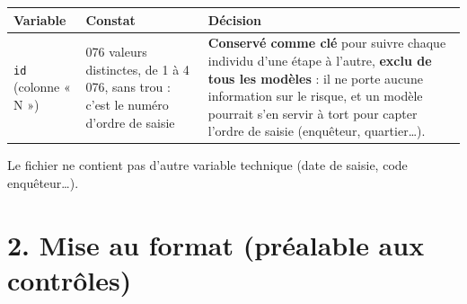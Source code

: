 \documentclass[

  french,

  10pt,

  a4paper,

]{article}
\newcounter{none} %
\begin{document}
{\def\LTcaptype{none} %

\begin{longtable}[]{@{}

  >{\raggedright\arraybackslash}p{}

  >{\raggedright\arraybackslash}p{}

  >{\raggedright\arraybackslash}p{}@{}}

\toprule\noalign{}

\begin{minipage}[b]{\linewidth}\raggedright

Variable

\end{minipage} & \begin{minipage}[b]{\linewidth}\raggedright

Constat

\end{minipage} & \begin{minipage}[b]{\linewidth}\raggedright

Décision

\end{minipage} \\

\midrule\noalign{}

\endhead

\bottomrule\noalign{}

\endlastfoot

\texttt{id} (colonne « N ») & 4 076 valeurs distinctes, de 1 à 4 076, sans trou : c'est le numéro d'ordre de saisie & \textbf{Conservé comme clé} pour suivre chaque individu d'une étape à l'autre, \textbf{exclu de tous les modèles} : il ne porte aucune information sur le risque, et un modèle pourrait s'en servir à tort pour capter l'ordre de saisie (enquêteur, quartier\ldots). \\

\end{longtable}

}



Le fichier ne contient pas d'autre variable technique (date de saisie, code enquêteur\ldots).



\section{2. Mise au format (préalable aux contrôles)}
\end{document}

